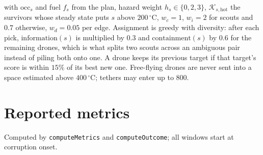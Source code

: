 \documentclass[11pt]{article}
\newcommand{\Kset}{\mathcal{K}}
\newcommand{\degC}{^\circ\mathrm{C}}
\begin{document}
with $\mathrm{occ}_s$ and fuel $f_s$ from the plan, hazard weight $h_s \in \{0, 2, 3\}$, $\Kset_{s,\mathrm{hot}}$ the survivors whose steady state puts $s$ above $200\,\degC$, $w_c = 1$, $w_i = 2$ for scouts and $0.7$ otherwise, $w_d = 0.05$ per edge. Assignment is greedy with diversity: after each pick, $\mathrm{information}(s)$ is multiplied by $0.3$ and $\mathrm{containment}(s)$ by $0.6$ for the remaining drones, which is what splits two scouts across an ambiguous pair instead of piling both onto one. A drone keeps its previous target if that target's score is within $15\%$ of its best new one. Free-flying drones are never sent into a space estimated above $400\,\degC$; tethers may enter up to $800$.

\section{Reported metrics}

Computed by \texttt{computeMetrics} and \texttt{computeOutcome}; all windows start at corruption onset.
\end{document}
